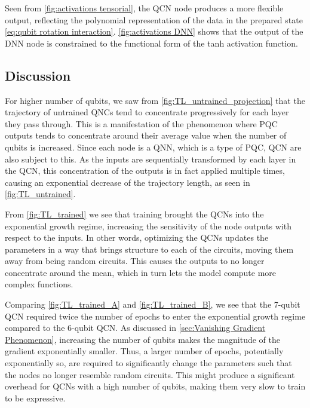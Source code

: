 Seen from \cref{fig:activations tensorial}, the QCN node produces a more flexible output, reflecting the polynomial representation of the data in the prepared state \cref{eq:qubit rotation interaction}. \cref{fig:activations DNN} shows that the output of the DNN node is constrained to the functional form of the tanh activation function.   




\subsection{Discussion}\label{sec:Discussion Expressivity}

For higher number of qubits, we saw from \cref{fig:TL_untrained_projection} that the trajectory of untrained QNCs tend to concentrate progressively for each layer they pass through. This is a manifestation of the phenomenon where PQC outputs tends to concentrate around their average value when the number of qubits is increased. Since each node is a QNN, which is a type of PQC, QCN are also subject to this. As the inputs are sequentially transformed by each layer in the QCN, this concentration of the outputs is in fact applied multiple times, causing an exponential decrease of the trajectory length, as seen in \cref{fig:TL_untrained}.

From \cref{fig:TL_trained} we see that training brought the QCNs into the exponential growth regime, increasing the sensitivity of the node outputs with respect to the inputs. In other words, optimizing the QCNs updates the parameters in a way that brings structure to each of the circuits, moving them away from being random circuits. This causes the outputs to no longer concentrate around the mean, which in turn lets the model compute more complex functions. 

Comparing \cref{fig:TL_trained_A} and \cref{fig:TL_trained_B}, we see that the 7-qubit QCN required twice the number of epochs to enter the exponential growth regime compared to the 6-qubit QCN. As discussed in \cref{sec:Vanishing Gradient Phenomenon}, increasing the number of qubits makes the magnitude of the gradient exponentially smaller. Thus, a larger number of epochs, potentially exponentially so, are required to significantly change the parameters such that the nodes no longer resemble random circuits. This might produce a significant overhead for QCNs with a high number of qubits, making them very slow to train to be expressive.  

